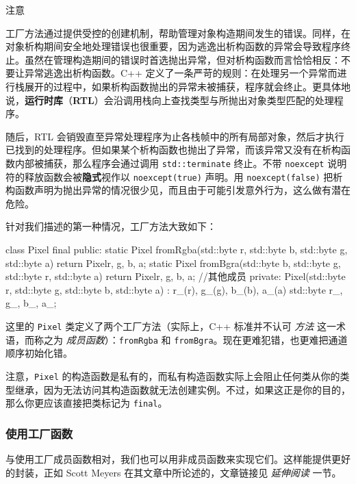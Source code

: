 \begin{myNotic}{注意}

\label{idx:570}
工厂方法通过提供受控的创建机制，帮助管理对象构造期间发生的错误。同样，在对象析构期间安全地处理错误也很重要，因为逃逸出析构函数的异常会导致程序终止。虽然在管理构造期间的错误时首选抛出异常，但对析构函数而言恰恰相反：不要让异常逃逸出析构函数。C++ 定义了一条严苛的规则：在处理另一个异常而进行栈展开的过程中，如果析构函数抛出的异常未被捕获，程序就会终止。更具体地说，\textbf{运行时库}（\textbf{RTL}）会沿调用栈向上查找类型与所抛出对象类型匹配的处理程序。

随后，RTL 会销毁直至异常处理程序为止各栈帧中的所有局部对象，然后才执行已找到的处理程序。但如果某个析构函数也抛出了异常，而该异常又没有在析构函数内部被捕获，那么程序会通过调用 \texttt{std::\allowbreak{}terminate} 终止。不带 \texttt{noexcept} 说明符的释放函数会被\textbf{隐式}视作以 \texttt{noexcept(\allowbreak{}true)\allowbreak{}} 声明。用 \texttt{noexcept(\allowbreak{}false)\allowbreak{}} 把析构函数声明为抛出异常的情况很少见，而且由于可能引发意外行为，这么做有潜在危险。
\end{myNotic}

\label{idx:571}
针对我们描述的第一种情况，工厂方法大致如下：

\begin{codebox}[cpp]
class Pixel final {
public:
    static Pixel fromRgba(std::byte r, std::byte b, std::byte g, std::byte a) {
      return Pixel{r, g, b, a};
    }
    static Pixel fromBgra(std::byte b, std::byte g, std::byte r, std::byte a) {
        return Pixel{r, g, b, a};
    }
    //其他成员
private:
    Pixel(std::byte r, std::byte g, std::byte b, std::byte a)
        : r_(r), g_(g), b_(b), a_(a) {}
    std::byte r_, g_, b_, a_;
}
\end{codebox}

这里的 \texttt{Pixel} 类定义了两个工厂方法（实际上，C++ 标准并不认可 \emph{方法} 这一术语，而称之为 \emph{成员函数}）：\texttt{fromRgba} 和 \texttt{fromBgra}。现在更难犯错，也更难把通道顺序初始化错。

\label{idx:572}
注意，\texttt{Pixel} 的构造函数是私有的，而私有构造函数实际上会阻止任何类从你的类型继承，因为无法访问其构造函数就无法创建实例。不过，如果这正是你的目的，那么你更应该直接把类标记为 \texttt{final}。

\subsubsection{使用工厂函数}

\label{idx:573}
与使用工厂成员函数相对，我们也可以用非成员函数来实现它们。这样能提供更好的封装，正如 Scott Meyers 在其文章中所论述的，文章链接见 \emph{延伸阅读} 一节。

